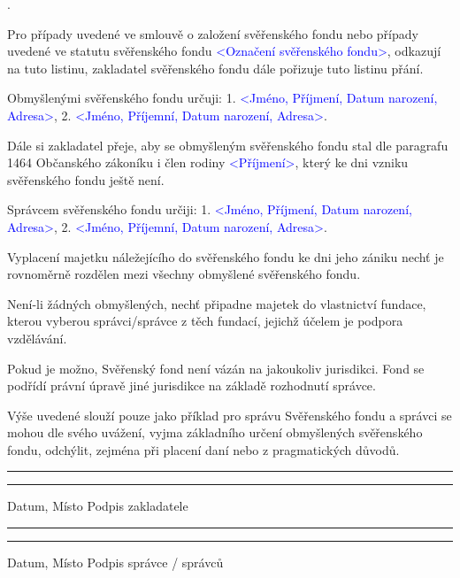 \documentclass[parskip=half]{scrreprt}
\begin{document}
.

\begin{contract}



Pro případy uvedené ve smlouvě o založení svěřenského fondu nebo případy uvedené ve statutu svěřenského fondu \textcolor{blue}{<Označení svěřenského fondu>}, odkazují na tuto listinu, zakladatel svěřenského fondu dále pořizuje tuto listinu přání.


Obmyšlenými svěřenského fondu určuji:
1. \textcolor{blue}{<Jméno, Příjmení, Datum narození, Adresa>},
2. \textcolor{blue}{<Jméno, Příjemní, Datum narození, Adresa>}.

Dále si zakladatel přeje, aby se obmyšleným svěřenského fondu stal dle paragrafu 1464 Občanského zákoníku i člen rodiny \textcolor{blue}{<Příjmení>}, který ke dni vzniku svěřenského fondu ještě není.


Správcem svěřenského fondu určiji:
1. \textcolor{blue}{<Jméno, Příjmení, Datum narození, Adresa>},
2. \textcolor{blue}{<Jméno, Příjemní, Datum narození, Adresa>}.


Vyplacení majetku náležejícího do svěřenského fondu ke dni jeho zániku nechť je rovnoměrně rozdělen mezi všechny obmyšlené svěřenského fondu.

Není-li žádných obmyšlených, nechť připadne majetek do vlastnictví fundace, kterou vyberou správci/správce z těch fundací, jejichž účelem je podpora vzdělávání.



Pokud je možno, Svěřenský fond není vázán na jakoukoliv jurisdikci. Fond se podřídí právní úpravě jiné jurisdikce na základě rozhodnutí správce.

Výše uvedené slouží pouze jako příklad pro správu Svěřenského fondu a správci se mohou dle svého uvážení, vyjma základního určení obmyšlených svěřenského fondu, odchýlit, zejména při placení daní nebo z pragmatických důvodů.
	
\end{contract}
\newpage

\vspace{50pt} 
\noindent\rule{7cm}{.4pt}\hfill\rule{7cm}{.4pt}\par 
\noindent Datum, Místo \hfill Podpis zakladatele

\vspace{50pt} 
\noindent\rule{7cm}{.4pt}\hfill\rule{7cm}{.4pt}\par 
\noindent Datum, Místo \hfill Podpis správce / správců
\end{document}
